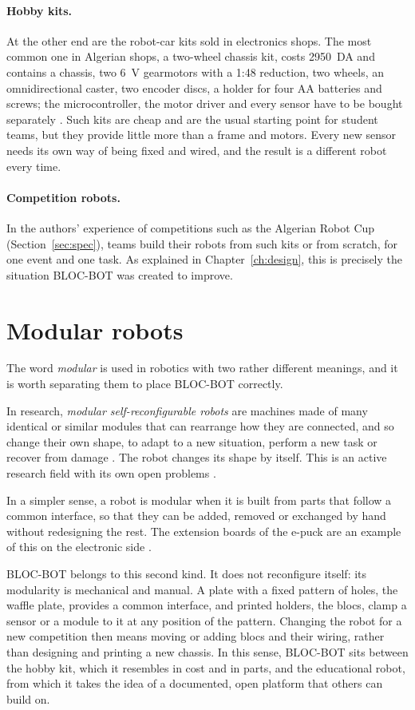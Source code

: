 \paragraph{Hobby kits.} At the other end are the robot-car kits sold in electronics shops.
The most common one in Algerian shops, a two-wheel chassis kit, costs 2950~DA and contains
a chassis, two 6~V gearmotors with a 1:48 reduction, two wheels, an omnidirectional caster,
two encoder discs, a holder for four AA batteries and screws; the microcontroller, the
motor driver and every sensor have to be bought separately \cite{mhtronic_kit}. Such kits
are cheap and are the usual starting point for student teams, but they provide little more
than a frame and motors. Every new sensor needs its own way of being fixed and wired, and
the result is a different robot every time.

\paragraph{Competition robots.} In the authors' experience of competitions such as the Algerian
Robot Cup (Section~\ref{sec:spec}), teams build their robots from such kits or from
scratch, for one event and one task. As explained in Chapter~\ref{ch:design}, this is precisely the
situation BLOC-BOT was created to improve.

\section{Modular robots}
\label{sec:modular}
The word \emph{modular} is used in robotics with two rather different meanings, and it is
worth separating them to place BLOC-BOT correctly.

In research, \emph{modular self-reconfigurable robots} are machines made of many identical
or similar modules that can rearrange how they are connected, and so change their own
shape, to adapt to a new situation, perform a new task or recover from damage
\cite{yim2007modular}. The robot changes its shape by itself. This is an active research field
with its own open problems \cite{yim2007modular}.

In a simpler sense, a robot is modular when it is built from parts that follow a common
interface, so that they can be added, removed or exchanged by hand without redesigning the
rest. The extension boards of the e-puck are an example of this on the electronic side
\cite{mondada2009epuck}.

BLOC-BOT belongs to this second kind. It does not reconfigure itself: its modularity is
mechanical and manual. A plate with a fixed pattern of holes, the waffle plate, provides
a common interface, and printed holders, the blocs, clamp a sensor or a module to it at
any position of the pattern. Changing the robot for a new competition then means moving or
adding blocs and their wiring, rather than designing and printing a new chassis. In this
sense, BLOC-BOT sits between the hobby kit, which it resembles in cost and in parts, and the
educational robot, from which it takes the idea of a documented, open platform that others
can build on.


